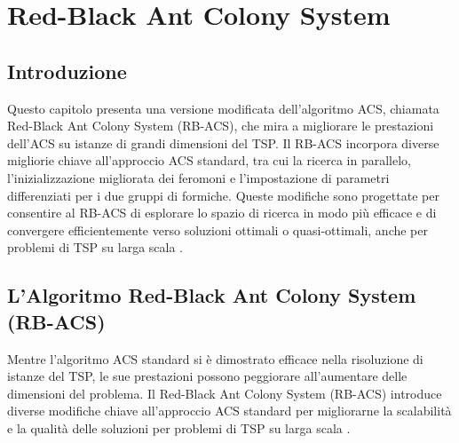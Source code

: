 
%

\chapter{Red-Black Ant Colony System}
\label{chapt:6}

\section{Introduzione}

Questo capitolo presenta una versione modificata dell'algoritmo \gls{ACS}, chiamata Red-Black Ant Colony System (\gls{RB-ACS}), che mira a migliorare le prestazioni dell'\gls{ACS} su istanze di grandi dimensioni del \gls{TSP}. Il \gls{RB-ACS} incorpora diverse migliorie chiave all'approccio  \gls{ACS} standard, tra cui la ricerca in parallelo, l'inizializzazione migliorata dei feromoni e l'impostazione di parametri differenziati per i due gruppi di formiche. Queste modifiche sono progettate per consentire al \gls{RB-ACS} di esplorare lo spazio di ricerca in modo più efficace e di convergere efficientemente verso soluzioni ottimali o quasi-ottimali, anche per problemi di \gls{TSP} su larga scala \cite{Hassan2013}.

\section{L'Algoritmo Red-Black Ant Colony System (\gls{RB-ACS})}
Mentre l'algoritmo  \gls{ACS} standard si è dimostrato efficace nella risoluzione di istanze del \gls{TSP}, le sue prestazioni possono peggiorare all'aumentare delle dimensioni del problema. Il Red-Black Ant Colony System (\gls{RB-ACS})  introduce diverse modifiche chiave all'approccio  \gls{ACS} standard per migliorarne la scalabilità e la qualità delle soluzioni per problemi di \gls{TSP} su larga scala \cite{Hassan2013}.

